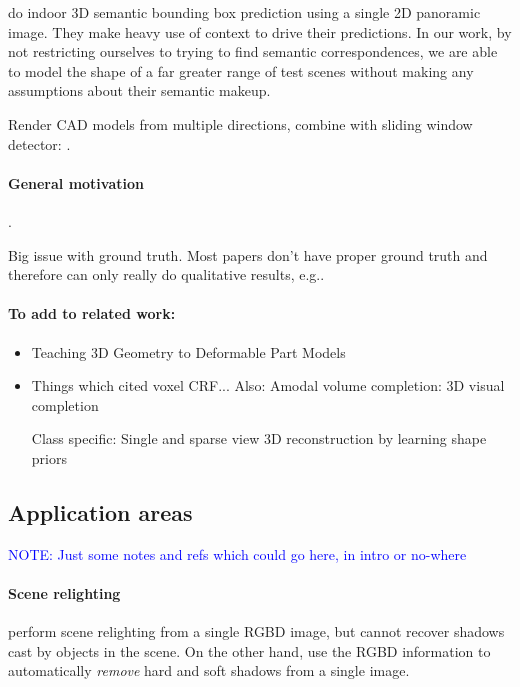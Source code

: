 \documentclass[10pt,twocolumn,letterpaper]{article}
\makeatletter
\renewcommand*{\eg}{e.g.\@\xspace}
\newcommand{\note}[1]{\textcolor{blue}{NOTE: #1}}
\makeatother
\begin{document}
\cite{zhang-eccv-2014} do indoor 3D semantic bounding box prediction using a single 2D panoramic image. They make heavy use of context to drive their predictions.
In our work, by not restricting ourselves to trying to find semantic correspondences, we are able to model the shape of a far greater range of test scenes without making any assumptions about their semantic makeup.

Render CAD models from multiple directions, combine with sliding window detector: \cite{song-eccv-2014}.


\paragraph{General motivation}

 \cite{nan-acm-2012}.

Big issue with ground truth. Most papers don't have proper ground truth and therefore can only really do qualitative results, \eg \cite{all the papers...}.

\paragraph{To add to related work:}
\begin{itemize}
\item Teaching 3D Geometry to Deformable Part Models
\item Things which cited voxel CRF...
Also: Amodal volume completion: 3D visual completion

Class specific: Single and sparse view 3D reconstruction by learning shape priors


\end{itemize}

\subsection{Application areas}
\note{Just some notes and refs which could go here, in intro or no-where}

\paragraph{Scene relighting}
\cite{ikeda-acpr-2013} perform scene relighting from a single RGBD image, but cannot recover shadows cast by objects in the scene.
On the other hand, \cite{xiao-cvpr-2014} use the RGBD information to automatically \textit{remove} hard and soft shadows from a single image.
\end{document}
